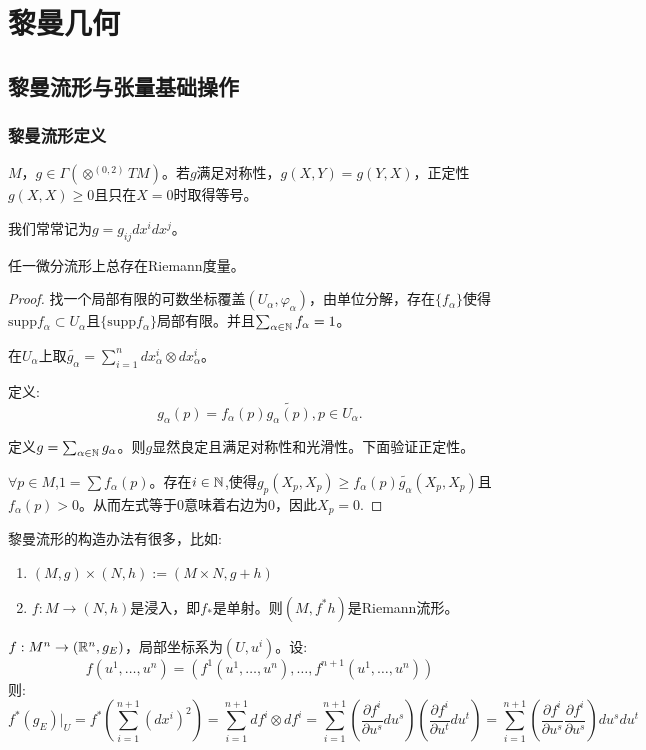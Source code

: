 \ifx\allfiles\undefined

	
	
\else
\fi
\part{黎曼几何}
\chapter{黎曼流形与张量基础操作}
\section{黎曼流形定义}

\begin{definition}
    $M$，$g \in \Gamma(\otimes^{(0,2)}TM)$。若$g$满足对称性，$g(X,Y)=g(Y,X)$，正定性$g(X,X)\geq 0$且只在$X=0$时取得等号。

    我们常常记为$g=g_{ij}dx^idx^j$。
\end{definition}
\begin{theorem}
任一微分流形上总存在Riemann度量。
\end{theorem}
\begin{proof}
    找一个局部有限的可数坐标覆盖$(U_\alpha,\varphi_\alpha)$，由单位分解，存在$\{f_\alpha\}$使得$\mathrm{supp}f_\alpha \subset U_\alpha$且$\{\mathrm{supp}f_\alpha\}$局部有限。并且$\sum_{\alpha \in \mathbb{N}}f_\alpha=1$。

    在$U_\alpha$上取$\tilde{g_\alpha}=\sum_{i=1}^n dx_\alpha^i \otimes dx_\alpha^i$。

    定义:
    $$
    g_\alpha(p)=f_\alpha(p)\tilde{g_\alpha(p)}, p \in U_\alpha.
    $$

    定义$g=\sum_{\alpha \in \mathbb{N}}g_\alpha$。则$g$显然良定且满足对称性和光滑性。下面验证正定性。

    $\forall  p \in M$,$1=\sum f_\alpha(p)$。存在$i \in \mathbb{N}$,使得$g_p(X_p,X_p)\geq f_\alpha(p)\tilde{g_\alpha}(X_p,X_p)$且$f_\alpha(p)>0$。从而左式等于$0$意味着右边为0，因此$X_p=0$.
\end{proof}
黎曼流形的构造办法有很多，比如:
\begin{enumerate}
    \item $(M,g)\times (N,h) :=(M\times N,g+h)$
    \item $f:M\to (N,h)$是浸入，即$f_*$是单射。则$(M,f^*h)$是Riemann流形。
\end{enumerate}
\begin{example}[$\R^{n+1}$中的超曲面]
    $f:M^n \to (\mathbb{R}^n,g_E)$，局部坐标系为$(U,u^i)$。设:
    $$
    f(u^1,\dots,u^n)=(f^1(u^1,\dots,u^n),\dots,f^{n+1}(u^1,\dots,u^n))
    $$
    则:
    $$
    f^*(g_E)|_U=f^*(\sum_{i=1}^{n+1} (dx^i)^2)=\sum_{i=1}^{n+1}df^i \otimes df^i=\sum_{i=1}^{n+1} (\frac{\partial f^i}{\partial u^s}du^s)(\frac{\partial f^i}{\partial u^t}du^t)=\sum_{i=1}^{n+1}(\frac{\partial f^i}{\partial u^s}\frac{\partial f^i}{\partial u^s})du^sdu^t    
    $$
\end{example}
